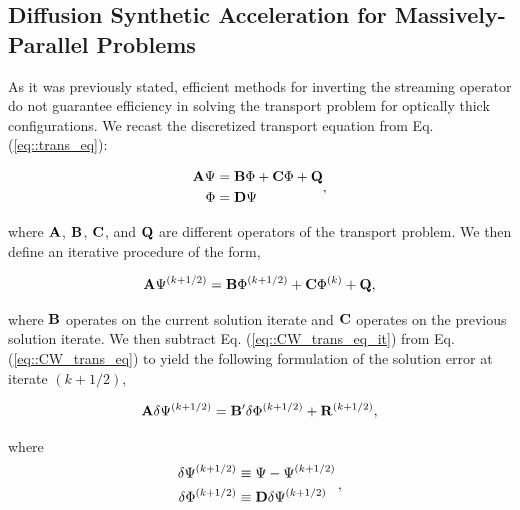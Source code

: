 \documentclass[11pt]{article}
\begin{document}
\subsection{Diffusion Synthetic Acceleration for Massively-Parallel Problems}
\label{sec::CW_DSA}

As it was previously stated, efficient methods for inverting the streaming operator do not guarantee efficiency in solving the transport problem for optically thick configurations. We recast the discretized transport equation from Eq. (\ref{eq::trans_eq}):

\begin{equation}
\label{eq::CW_trans_eq}
\begin{aligned}
{\bf A} \Psi &= {\bf B} \Phi +  {\bf C} \Phi + {\bf Q} \\
\Phi &= {\bf D} \Psi
\end{aligned} ,
\end{equation}

\noindent where ${\bf A}$, ${\bf B}$, ${\bf C}$, and ${\bf Q}$ are different operators of the transport problem. We then define an iterative procedure of the form,

\begin{equation}
\label{eq::CW_trans_eq_it}
{\bf A} \Psi^{(k+1/2)} = {\bf B} \Phi^{(k+1/2)} + {\bf C} \Phi^{(k)} + {\bf Q},
\end{equation}

\noindent where ${\bf B}$ operates on the current solution iterate and ${\bf C}$ operates on the previous solution iterate. We then subtract Eq. (\ref{eq::CW_trans_eq_it}) from Eq. (\ref{eq::CW_trans_eq}) to yield the following formulation of the solution error at iterate $(k+1/2)$,

\begin{equation}
\label{eq::CW_trans_eq_it_diff}
{\bf A} \delta \Psi^{(k+1/2)} = {\bf B}' \delta \Phi^{(k+1/2)} + {\bf R}^{(k+1/2)}, 
\end{equation}

\noindent where
\begin{equation}
\label{eq::CW_delta_fluxes}
\begin{aligned}
\delta \Psi^{(k+1/2)} &\equiv  \Psi - \Psi^{(k+1/2)} \\
\delta \Phi^{(k+1/2)} &\equiv {\bf D} \delta \Psi^{(k+1/2)}
\end{aligned} \, ,
\end{equation}
\end{document}

